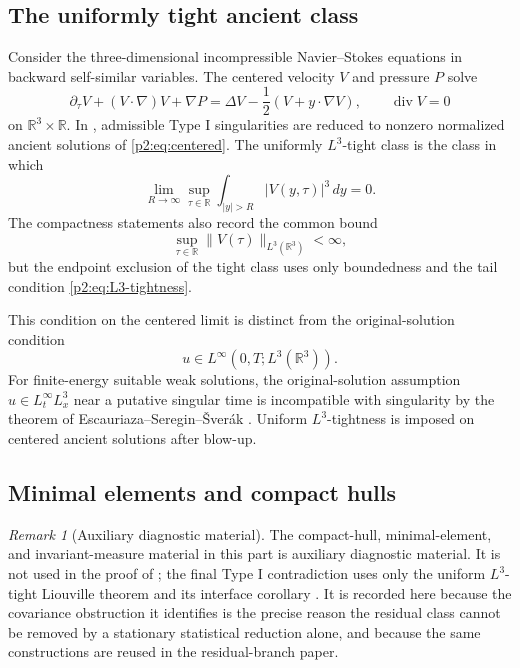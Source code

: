 \documentclass[11pt]{amsart}
\theoremstyle{plain}
\theoremstyle{definition}
\theoremstyle{remark}
\newtheorem{remark}[remark]{Remark}
\numberwithin{equation}{section}
\newcommand{\R}{\mathbb R}
\newcommand{\divergence}{\operatorname{div}}
\begin{document}
\subsection{The uniformly tight ancient class}

Consider the three-dimensional incompressible Navier--Stokes equations in
backward self-similar variables.  The centered velocity \(V\) and pressure \(P\)
solve
\begin{equation}\label{p2:eq:centered}
   \partial_\tau V+(V\cdot\nabla)V+\nabla P
   =
   \Delta V-\frac12(V+y\cdot\nabla V),
   \qquad \divergence V=0
\end{equation}
on \(\R^3\times\R\).  In , admissible Type I
singularities are reduced to nonzero normalized ancient solutions of
\eqref{p2:eq:centered}.  The uniformly \(L^3\)-tight class is the class in which
\begin{equation}\label{p2:eq:L3-tightness}
   \lim_{R\to\infty}
   \sup_{\tau\in\R}\int_{|y|>R}|V(y,\tau)|^3\,dy=0 .
\end{equation}
The compactness statements also record the common bound
\begin{equation}\label{p2:eq:L3-bound}
   \sup_{\tau\in\R}\|V(\tau)\|_{L^3(\R^3)}<\infty ,
\end{equation}
but the endpoint exclusion of the tight class uses only boundedness and the
tail condition \eqref{p2:eq:L3-tightness}.

This condition on the centered limit is distinct from the original-solution condition
\[
   u\in L^\infty(0,T;L^3(\R^3)).
\]
For finite-energy suitable weak solutions, the original-solution assumption
\(u\in L^\infty_tL^3_x\) near a putative singular time is incompatible with
singularity by the theorem of Escauriaza--Seregin--\v{S}ver\'ak
\cite{ESS2003}.  Uniform \(L^3\)-tightness is imposed on centered ancient
solutions after blow-up.

\subsection{Minimal elements and compact hulls}

\begin{remark}[Auxiliary diagnostic material]
\label{p2:rem:auxiliary-dynamical-material}
The compact-hull, minimal-element, and invariant-measure material in this
part is auxiliary diagnostic material.  It is not used in the proof of
; the final Type I contradiction uses only the
uniform \(L^3\)-tight Liouville theorem
 and its interface corollary
.  It is recorded here because the
covariance obstruction it identifies is the precise reason the residual
class cannot be removed by a stationary statistical reduction alone, and
because the same constructions are reused in the residual-branch paper.
\end{remark}
\end{document}
